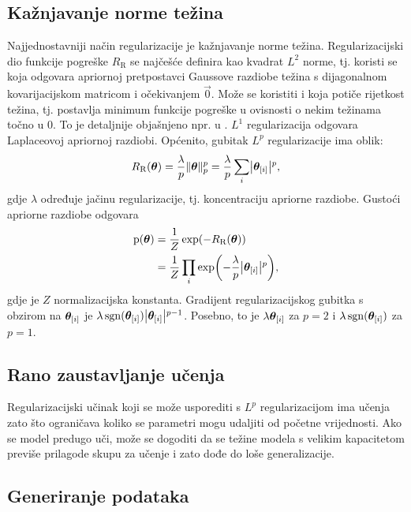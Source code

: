 \documentclass[utf8, diplomski, lmodern]{fer}
\begin{document}
\subsection{Kažnjavanje norme težina}

Najjednostavniji način regularizacije je kažnjavanje norme težina. Regularizacijski dio funkcije pogreške $R_\text{R}$ se najčešće definira kao kvadrat $L^2$ norme, tj. koristi se  koja odgovara apriornoj pretpostavci Gaussove razdiobe težina s dijagonalnom kovarijacijskom matricom i očekivanjem $\vec 0$. Može se koristiti i  koja potiče rijetkost težina, tj. postavlja minimum funkcije pogreške u ovisnosti o nekim težinama točno u $0$. To je detaljnije objašnjeno npr. u \citet{Goodfellow:2016:DL}. $L^1$ regularizacija odgovara Laplaceovoj apriornoj razdiobi.  Općenito, gubitak $L^p$ regularizacije ima oblik:
\begin{align}
	R_\text{R}(\vec\theta) 
	= \frac{\lambda}{p}\enVert{\vec\theta}_p^p 
	= \frac{\lambda}{p}\sum_i \envert{\vec\theta_\ind{i}}^p \text{,}
\end{align}
gdje $\lambda$ određuje jačinu regularizacije, tj. koncentraciju apriorne razdiobe. Gustoći apriorne razdiobe odgovara
\begin{align}
\p(\vec\theta) &= \frac{1}{Z}\exp(-R_\text{R}(\vec\theta)) \\
&= \frac{1}{Z}\prod_i\exp\del{-\frac{\lambda}{p}\envert{\vec\theta_\ind{i}}^p} \text{,}
\end{align}
gdje je $Z$ normalizacijska konstanta. Gradijent regularizacijskog gubitka s obzirom na $\vec\theta_\ind{i}$ je $\lambda\sgn(\vec\theta_\ind{i})\envert{\vec\theta_\ind{i}}^{p-1}$. Posebno, to je  $\lambda\vec\theta_\ind{i}$ za $p=2$ i  $\lambda\sgn(\vec\theta_\ind{i})$ za $p=1$.

\subsection{Rano zaustavljanje učenja}

Regularizacijski učinak koji se može usporediti s $L^p$ regularizacijom ima  učenja zato što ograničava koliko se parametri mogu udaljiti od početne vrijednosti. Ako se model predugo uči, može se dogoditi da se težine modela s velikim kapacitetom previše prilagode skupu za učenje i zato dođe do loše generalizacije.

\subsection{Generiranje podataka} \label{subsec:du-generiranje-podataka}
\end{document}

